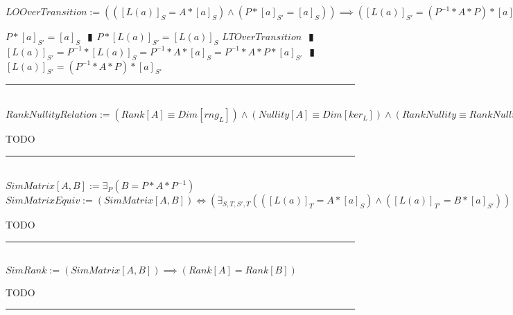 \documentclass{book}
\newcommand{\abr}{:=}
\newcommand{\pipe}{$\phantom{(}\vrectangleblack\phantom{)}$}
\begin{document}
$LOOverTransition \abr (([L(a)]_S = A * [a]_S) \land (P * [a]_{S'} = [a]_S)) \implies ([L(a)]_{S'} = (P^{-1} * A * P) * [a]_{S'})$
\begin{enumerate}
  \lit $P * [a]_{S'} = [a]_S$ \pipe $P * [L(a)]_{S'} = [L(a)]_S$
  \lit $LTOverTransition$ \pipe $[L(a)]_{S'} = P^{-1} * [L(a)]_S = P^{-1} * A * [a]_S = P^{-1} * A * P * [a]_{S'}$ \pipe $[L(a)]_{S'} = (P^{-1} * A * P) * [a]_{S'}$
\end{enumerate} \vspace{.75mm} \hrule \vspace{.75mm} \ \\ 

$RankNullityRelation \abr (Rank[A] \equiv Dim[rng_L]) \land (Nullity[A] \equiv Dim[ker_L]) \land (RankNullity \equiv RankNullityLT)$ \\
\begin{enumerate}
  \lit TODO
\end{enumerate} \vspace{.75mm} \hrule \vspace{.75mm} \ \\ 

$SimMatrix[A, B] \abr \exists_{P}(B = P * A * P^{-1})$ \\

$SimMatrixEquiv \abr (SimMatrix[A, B]) \iff (\exists_{S, T, S', T}(([L(a)]_T = A * [a]_S) \land ([L(a)]_{T'} = B * [a]_{S'})))$ \\
\begin{enumerate}
  \lit TODO
\end{enumerate} \vspace{.75mm} \hrule \vspace{.75mm} \ \\ 

$SimRank \abr (SimMatrix[A, B]) \implies (Rank[A] = Rank[B])$
\begin{enumerate}
  \lit TODO
\end{enumerate} \vspace{.75mm} \hrule \vspace{.75mm} \ \\ 
\end{document}
